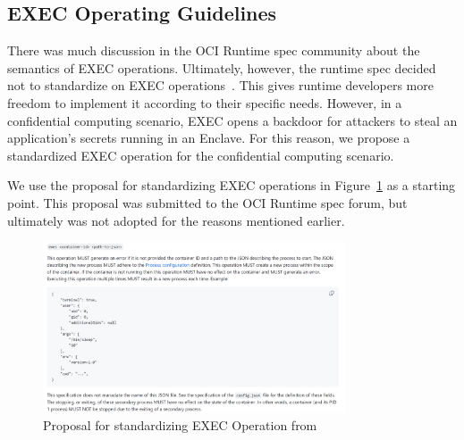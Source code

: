 \subsection{EXEC Operating Guidelines}

  There was much discussion in the OCI Runtime spec community about the semantics of EXEC operations. Ultimately, however, the runtime spec decided not to standardize on EXEC operations~\cite*{exec_semantics}. This gives runtime developers more freedom to implement it 
  according to their specific needs. However, in a confidential computing scenario, EXEC opens a backdoor for attackers to steal an application’s secrets running in an Enclave. For this reason, we propose a standardized EXEC operation for the 
  confidential computing scenario.

  We use the proposal for standardizing EXEC operations in Figure~\ref{fig:exec_propose} as a starting point. This proposal was submitted to the OCI Runtime spec forum, but ultimately was not adopted for the reasons mentioned earlier.

\begin{figure}[H]
    \centering
    \includegraphics[width=0.8\textwidth]{images/exec_propose.png}
    \caption[Proposal for standardizing EXEC operation]{Proposal for standardizing EXEC Operation from~\cite*{exec_proposal} }
    \label{fig:exec_propose}
\end{figure}


